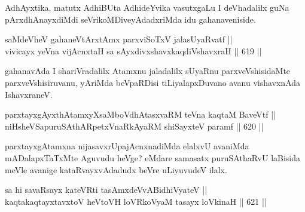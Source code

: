 \begin{artha}
AdhAyxtika, matutx AdhiBUta AdhideYvika vasutxgaLu I deVhadalilx guNa pArxdhAnayxdiMdi seVrikoMDiveyAdadxriMda idu gahanaveniside.
\end{artha}


\begin{shl}
saMdeVheV gahaneV\s tArx\s \s tAmx parxviSoTxV jalasUyaRvatf || \\
vivicayx yeVna vijAcnxtaH sa sAyxdivxshavxkaqdiVshavxraH \hfill || 619 ||  
\end{shl}

\begin{artha}
gahanavAda I shariVradalilx Atamxnu jaladalilx sUyaRnu parxveVshisidaMte parxveVshisiruvanu, yAriMda beVpaRDisi tiLiyalapxDuvano avanu vishavxnAda IshavxraneV.
\end{artha}


\begin{shl}
parxtayxgAyxthAtamxyXsaMboVdhAtasxvaRM teVna kaqtaM BaveVtf || \\
niHsheVSapuruSAthARpetxVnaR\footnotemark[1] kAyaRM shiSayxteV paramf \hfill || 620 ||  
\end{shl}

\begin{artha}
parxtayxgAtamxna nijasavxrUpajAcnxnadiMda elalxvU avaniMda mADalapxTaTxMte Aguvudu heVge? eMdare samasatx puruSAthaRvU laBisida meVle avanige kataRvayxvAdadudx beVre uLiyuvudeV ilalx.
\end{artha}


\begin{shl}
sa hi savaRsayx kateVRti tasAmxdeVvABidhiVyateV || \\
kaqtakaqtayxtavxtoV heVtoVH \footnotemark[2]loVRkoV\s yaM tasayx \footnotemark[3]loVkinaH \hfill || 621 ||  
\end{shl}

